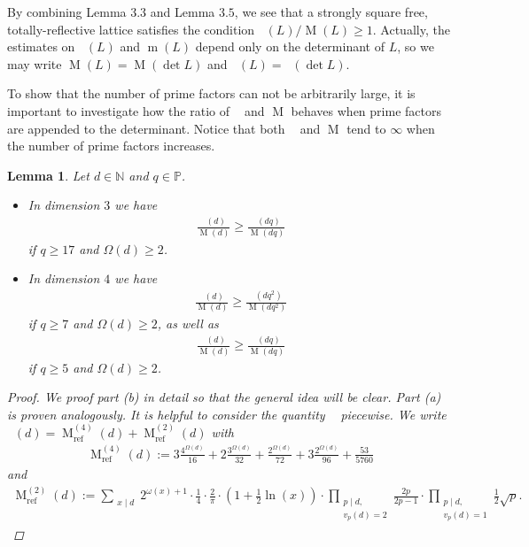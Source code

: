 \documentclass{amsart}
\newtheorem{lem}[thm]{Lemma}
\theoremstyle{definition}
\theoremstyle{remark}
\def\PP{\mathbb{P}}
\DeclareMathOperator{\m}{m}
\DeclareMathOperator{\mref}{m_{ref}}
\DeclareMathOperator{\M}{M}
\DeclareMathOperator{\Mref}{M_{ref}}
\begin{document}
By combining Lemma $3.3$ and Lemma $3.5$, we see that a strongly square free, totally-reflective lattice satisfies the condition $\Mref(L) / \M(L) \geq 1$.
Actually, the estimates on $\mref(L)$ and $\m(L)$ depend only on the determinant of $L$, so we may write $\M(L) = \M(\det L)$ and $\Mref(L) = \Mref(\det L)$.

To show that the number of prime factors can not be arbitrarily large, 
it is important to investigate how the ratio of $\Mref$ and $\M$ behaves when prime factors are appended to the determinant.
Notice that both $\Mref$ and $\M$ tend to $\infty$ when the number of prime factors increases.
\begin{lem} Let $d \in \mathbb{N}$ and $q \in \PP$.
 \begin{itemize}
  \item[(a)] In dimension $3$ we have 
   \begin{align*}
     \frac{\Mref(d)}{\M(d)} \geq \frac{\Mref(dq)}{\M(dq)}
   \end{align*}
  if $q \geq 17$ and $\Omega(d) \geq 2$.
  \item[(b)]In dimension $4$ we have 
   \begin{align*}
     \frac{\Mref(d)}{\M(d)} \geq \frac{\Mref(dq^2)}{\M(dq^2)}
   \end{align*}
  if $q \geq 7$ and $\Omega(d) \geq 2$, as well as
   \begin{align*}
    \frac{\Mref(d)}{\M(d)} \geq \frac{\Mref(dq)}{\M(dq)}
   \end{align*}
  if $q \geq 5$ and $\Omega(d) \geq 2$.
 \end{itemize}
 \begin{proof}
  We proof part (b) in detail so that the general idea will be clear. Part (a) is proven analogously.
  It is helpful to consider the quantity $\Mref$ piecewise. We write 
  $\Mref(d) = \M^{(4)}_{\mathrm{ref}}(d) + \M^{(2)}_{\mathrm{ref}}(d)$ with
  \begin{align*}
   \M^{(4)}_{\mathrm{ref}}(d):=3\frac{4^{\Omega(d)}}{16} + 2\frac{3^{\Omega(d)}}{32} + \frac{2^{\Omega(d)}}{72} + 3\frac{2^{\Omega(d)}}{96} + \frac{53}{5760}
  \end{align*}
  and
  \begin{align*}
   \M^{(2)}_{\mathrm{ref}}(d):=\sum_{\substack{x \mid d}} 2^{\omega(x)+1} \cdot \frac{1}{4} \cdot \frac{2}{\pi} 
                             \cdot  \left(1+\frac{1}{2}\ln(x)\right)
                             \cdot \prod_{\substack{p \mid d,\\v_p(d)=2}}\frac{2p}{2p-1} \cdot \prod_{\substack{p \mid d,\\v_p(d)=1}}\frac{1}{2}\sqrt{p}.

\end{align*}
\end{proof}
\end{lem}
\end{document}
